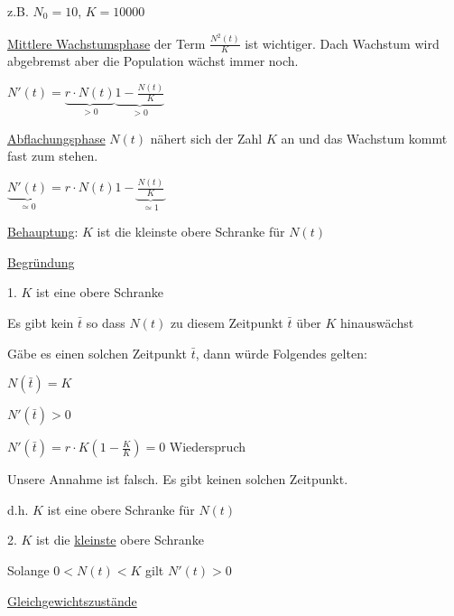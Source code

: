 \documentclass[18pt,a4paper]{scrreprt}
\begin{document}
z.B. $N_0 = 10$, $K = 10000$

\uline{Mittlere Wachstumsphase} der Term $\frac{N^2(t)}{K}$ ist wichtiger. Dach Wachstum wird abgebremst aber die Population wächst immer noch.

$N'(t) = \underbrace{r\cdot N(t)}_{>0} \underbrace{1-\frac{N(t)}{K}}_{>0}$

\uline{Abflachungsphase} $N(t)$ nähert sich der Zahl $K$ an und das Wachstum kommt fast zum stehen. 

$\underbrace{N'(t)}_{\simeq 0} = r\cdot N(t) 1-\underbrace{\frac{N(t)}{K}}_{\simeq 1}$ 

\uline{Behauptung}: $K$ ist die kleinste obere Schranke für $N(t)$

\uline{Begründung}

1. $K$ ist eine obere Schranke

Es gibt kein $\bar{t}$ so dass $N(t)$ zu diesem Zeitpunkt $\bar{t}$ über $K$ hinauswächst

Gäbe es einen solchen Zeitpunkt $\bar{t}$, dann würde Folgendes gelten:

$N(\bar{t}) = K$

$N'(\bar{t}) > 0$

$N'(\bar{t}) = r\cdot K (1-\frac{K}{K}) = 0$ Wiederspruch

Unsere Annahme ist falsch. Es gibt keinen solchen Zeitpunkt.

d.h. $K$ ist eine obere Schranke für $N(t)$

2. $K$ ist die \uline{kleinste} obere Schranke

Solange $0<N(t)<K$ gilt $N'(t)> 0$

\uline{Gleichgewichtszustände}
\end{document}
